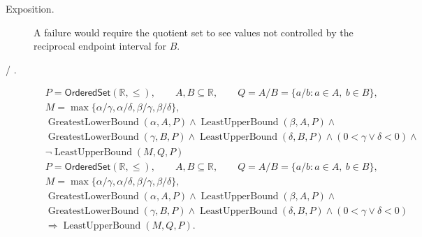 \begin{remark*}
\begin{description}
  \item[Exposition.]
A failure would require the quotient set to see values not controlled by the
reciprocal endpoint interval for $B$.


  \item[ / .]

\[
\begin{aligned}
&P=\mathsf{OrderedSet}(\mathbb{R},\leq),\qquad
A,B\subseteq\mathbb{R},\qquad Q=A/B=\{a/b:a\in A,\ b\in B\},\\
&M=\max\{\alpha/\gamma,\alpha/\delta,\beta/\gamma,\beta/\delta\},\\
&\operatorname{GreatestLowerBound}(\alpha,A,P)\land
\operatorname{LeastUpperBound}(\beta,A,P)\land\\
&\operatorname{GreatestLowerBound}(\gamma,B,P)\land
\operatorname{LeastUpperBound}(\delta,B,P)\land
(0<\gamma\lor\delta<0)\land\\
&\neg\operatorname{LeastUpperBound}(M,Q,P)
\end{aligned}
\]
\[
\begin{aligned}
&P=\mathsf{OrderedSet}(\mathbb{R},\leq),\qquad
A,B\subseteq\mathbb{R},\qquad Q=A/B=\{a/b:a\in A,\ b\in B\},\\
&M=\max\{\alpha/\gamma,\alpha/\delta,\beta/\gamma,\beta/\delta\},\\
&\operatorname{GreatestLowerBound}(\alpha,A,P)\land
\operatorname{LeastUpperBound}(\beta,A,P)\land\\
&\operatorname{GreatestLowerBound}(\gamma,B,P)\land
\operatorname{LeastUpperBound}(\delta,B,P)\land
(0<\gamma\lor\delta<0)\\
&\Longrightarrow \operatorname{LeastUpperBound}(M,Q,P).
\end{aligned}
\]
\end{description}
\end{remark*}

